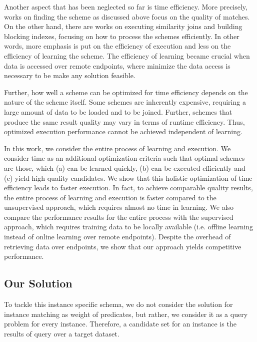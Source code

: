 Another aspect that has been neglected so far is time efficiency. More precisely, works on finding the scheme as discussed above focus on the quality of matches. On the other hand, there are works on executing similarity joins and building blocking indexes, focusing on how to process the schemes efficiently. In other words, more emphasis is put on the efficiency of execution and less on the efficiency of learning the scheme. The efficiency of learning became crucial when data is accessed over remote endpoints, where minimize the data access is necessary to be make any solution feasible.  

Further, how well a scheme can be optimized for time efficiency depends on the nature of the scheme itself. Some schemes are inherently expensive, requiring a large amount of data to be loaded and to be joined. Further, schemes that produce the same result quality may vary in terms of runtime efficiency. Thus, optimized execution performance cannot be achieved independent of learning. 

In this work, we consider the entire process of learning and execution. We consider time as an additional optimization criteria such that optimal schemes are those, which (a) can be learned quickly, (b) can be executed efficiently and (c) yield high quality candidates. We show that this holistic optimization of time efficiency leads to faster execution. In fact, to achieve comparable quality results, the entire process of learning and execution is faster compared to the unsupervised approach, which requires almost no time in learning.  We also compare the performance results for the entire process with the supervised approach, which requires training data to be locally available (i.e. offline learning instead of online learning over remote endpoints). Despite the overhead of retrieving data over endpoints, we show that our approach yields competitive performance. 


\subsection{Our Solution}
To tackle this instance specific schema, we do not consider the solution for instance matching as weight of predicates, but rather, we consider it as a query problem for every instance. Therefore, a candidate set for an instance is the results of query over a target dataset.




